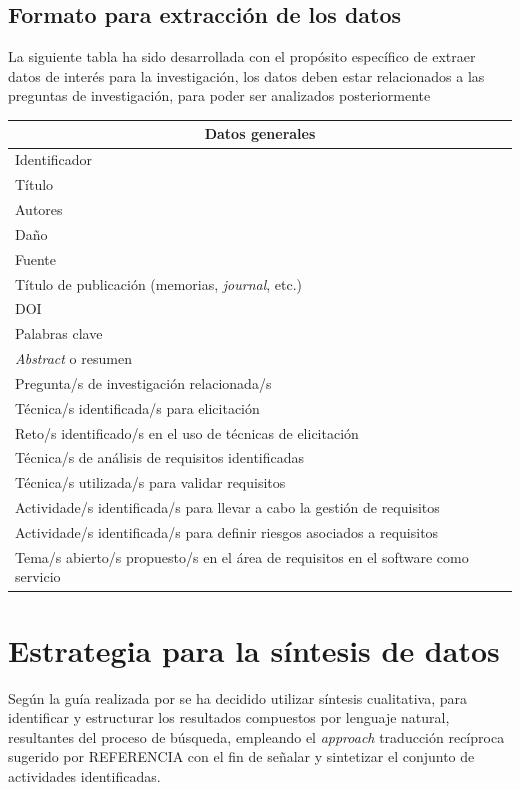 \documentclass{article}
\begin{document}
\subsection{Formato para extracción de los datos}
La siguiente tabla ha sido desarrollada con el propósito específico de extraer datos de interés para la investigación, 
los datos deben estar relacionados a las preguntas de investigación, para poder ser analizados posteriormente 

\begin{center}
\begin{tabular}{ |l|l| }
\hline
\multicolumn{2}{|c|}{Datos generales} \\
  \hline
    Identificador &       \\
    \hline
    Título & \\
    \hline
    Autores &\\
    \hline
    Daño & \\
    \hline
    Fuente & \\
    \hline
    Título de publicación (memorias, \emph{journal}, etc.) & \\
    \hline
    DOI & \\
    \hline
    Palabras clave & \\
    \hline
    \emph{Abstract} o resumen & \\
    \hline
    Pregunta/s de investigación relacionada/s & \\
    \hline
    Técnica/s identificada/s para elicitación& \\
    \hline
    Reto/s identificado/s en el uso de técnicas de elicitación& \\
    \hline
    Técnica/s de análisis de requisitos identificadas& \\
    \hline
    Técnica/s utilizada/s para validar requisitos & \\
    \hline
    Actividade/s identificada/s para llevar a cabo la gestión de requisitos& \\
    \hline
    Actividade/s identificada/s para definir riesgos asociados a requisitos& \\
    \hline
    Tema/s abierto/s propuesto/s en el área de requisitos en el software como servicio& \\
    \hline
 \hline
\end{tabular}
\end{center}

\section{Estrategia para la síntesis de datos}
Según la guía realizada por \cite{kitchenham2007guidelines} se ha decidido utilizar síntesis cualitativa, para identificar y estructurar los resultados compuestos por 
lenguaje natural, resultantes del proceso de búsqueda, empleando el \emph{approach} traducción recíproca sugerido por REFERENCIA con el fin de señalar 
y sintetizar el conjunto de actividades identificadas.
\newpage
\end{document}
